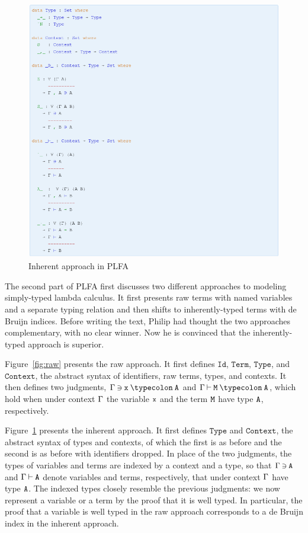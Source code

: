 \documentclass[preprint,authoryear]{elsarticle}
\begin{document}
\begin{figure}[t]
  \includegraphics[width=\textwidth]{figures/inherent.png}
  \caption{Inherent approach in PLFA}
  \label{fig:inherent}
\end{figure}  

The second part of PLFA first discusses two different approaches to
modeling simply-typed lambda calculus.  It first presents raw
terms with named variables and a separate typing relation and
then shifts to inherently-typed terms with de Bruijn indices.
Before writing the text, Philip had thought the two approaches
complementary, with no clear winner.  Now he is convinced that the
inherently-typed approach is superior.

Figure~\ref{fig:raw} presents the raw approach.
It first defines $\texttt{Id}$, $\texttt{Term}$,
$\texttt{Type}$, and $\texttt{Context}$, the abstract syntax
of identifiers, raw terms, types, and contexts.
It then defines two judgments,
$\GG\:{\ni}\:\ex\:{\typecolon}\:\AY$ and
$\GG\:{\vdash}\:\EM\:{\typecolon}\:\AY$,
which hold when under context $\Gamma$ the variable $\texttt{x}$
and the term $\texttt{M}$ have type $\texttt{A}$, respectively.

Figure~\ref{fig:inherent} presents the inherent approach.
It first defines $\texttt{Type}$ and $\texttt{Context}$, the abstract syntax
of types and contexts, of which the first is as before and the second is
as before with identifiers dropped.  In place of the two judgments,
the types of variables and terms are indexed by a context and a type,
so that $\Gamma\:{\ni}\:\texttt{A}$ and $\Gamma\:{\vdash}\:\texttt{A}$ denote
variables and terms, respectively, that under context $\Gamma$ have type $\texttt{A}$.
The indexed types closely resemble the previous judgments:
we now represent a variable or a term by the proof that it is well typed.
In particular, the proof that a variable is well typed in the raw approach
corresponds to a de Bruijn index in the inherent approach.
\end{document}
